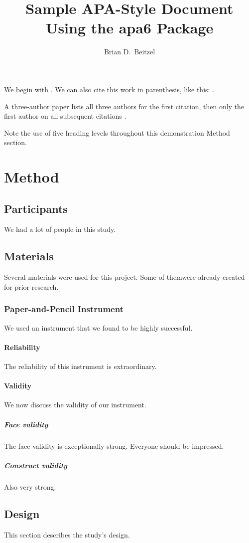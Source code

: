 \documentclass[jou]{apa6}
\title{Sample APA-Style Document Using the \textsf{apa6} Package}
\author{Brian D.\ Beitzel}
\affiliation{SUNY Oneonta}
\begin{document}
\maketitle
We begin with \textcite{Shotton1989}.  We can also cite this work in
parenthesis, like this: \parencite{Shotton1989}.

A three-author paper \parencite[e.g.,][]{Lassen2006} lists all
three authors for the first citation, then only the first author
on all subsequent citations \parencite{Lassen2006}.

Note the use of five heading levels throughout this demonstration
Method section.

\section{Method}
\subsection{Participants}
We had a lot of people in this study.

\subsection{Materials}
Several materials were used for this project.  Some of themwere
already created for prior research.

\subsubsection{Paper-and-Pencil Instrument}
We used an instrument that we found to be highly successful.

\paragraph{Reliability}
The reliability of this instrument is extraordinary.

\paragraph{Validity}
We now discuss the validity of our instrument.

\subparagraph{Face validity} The face validity is exceptionally
strong.  Everyone should be impressed.

\subparagraph{Construct validity} Also very strong.

\subsection{Design}
This section describes the study's design.
\end{document}
